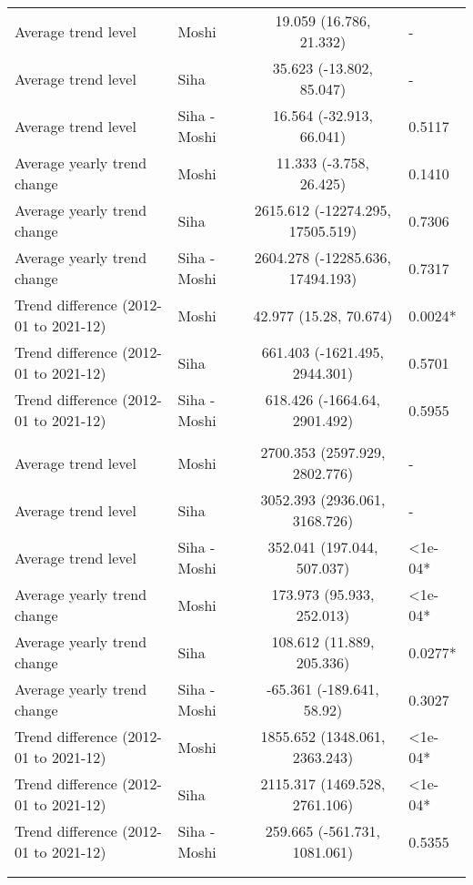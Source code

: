 \begin{longtable}{l|lcl}
\midrule\addlinespace[2.5pt]
\multicolumn{4}{l}{Typhoid} \\[2.5pt] 
\midrule\addlinespace[2.5pt]
Average trend level & Moshi & 19.059 (16.786, 21.332) & - \\ 
Average trend level & Siha & 35.623 (-13.802, 85.047) & - \\ 
Average trend level & Siha - Moshi & 16.564 (-32.913, 66.041) & 0.5117 \\ 
Average yearly trend change & Moshi & 11.333 (-3.758, 26.425) & 0.1410 \\ 
Average yearly trend change & Siha & 2615.612 (-12274.295, 17505.519) & 0.7306 \\ 
Average yearly trend change & Siha - Moshi & 2604.278 (-12285.636, 17494.193) & 0.7317 \\ 
Trend difference (2012-01 to 2021-12) & Moshi & 42.977 (15.28, 70.674) & 0.0024* \\ 
Trend difference (2012-01 to 2021-12) & Siha & 661.403 (-1621.495, 2944.301) & 0.5701 \\ 
Trend difference (2012-01 to 2021-12) & Siha - Moshi & 618.426 (-1664.64, 2901.492) & 0.5955 \\ 
\midrule\addlinespace[2.5pt]
\multicolumn{4}{l}{Upper Respiratory Infections} \\[2.5pt] 
\midrule\addlinespace[2.5pt]
Average trend level & Moshi & 2700.353 (2597.929, 2802.776) & - \\ 
Average trend level & Siha & 3052.393 (2936.061, 3168.726) & - \\ 
Average trend level & Siha - Moshi & 352.041 (197.044, 507.037) & <1e-04* \\ 
Average yearly trend change & Moshi & 173.973 (95.933, 252.013) & <1e-04* \\ 
Average yearly trend change & Siha & 108.612 (11.889, 205.336) & 0.0277* \\ 
Average yearly trend change & Siha - Moshi & -65.361 (-189.641, 58.92) & 0.3027 \\ 
Trend difference (2012-01 to 2021-12) & Moshi & 1855.652 (1348.061, 2363.243) & <1e-04* \\ 
Trend difference (2012-01 to 2021-12) & Siha & 2115.317 (1469.528, 2761.106) & <1e-04* \\ 
Trend difference (2012-01 to 2021-12) & Siha - Moshi & 259.665 (-561.731, 1081.061) & 0.5355 \\ 
\midrule\addlinespace[2.5pt]
\multicolumn{4}{l}{Urinary Tract Infections} \\[2.5pt] 
\midrule\addlinespace[2.5pt]

\end{longtable}
